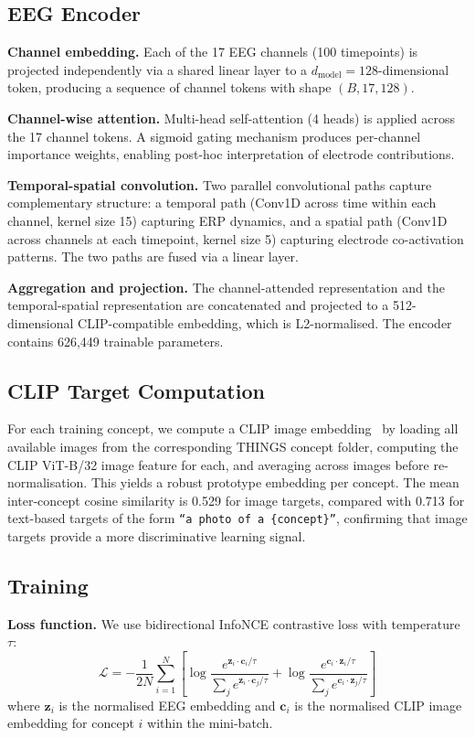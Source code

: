 \documentclass[conference]{IEEEtran}
\begin{document}
\subsection{EEG Encoder}

\textbf{Channel embedding.}
Each of the 17 EEG channels (100 timepoints)
is projected independently via a shared
linear layer to a $d_\text{model}{=}128$-dimensional
token, producing a sequence of channel
tokens with shape $(B, 17, 128)$.

\textbf{Channel-wise attention.}
Multi-head self-attention (4 heads) is
applied across the 17 channel tokens. A
sigmoid gating mechanism produces
per-channel importance weights, enabling
post-hoc interpretation of electrode
contributions.

\textbf{Temporal-spatial convolution.}
Two parallel convolutional paths capture
complementary structure: a temporal path
(Conv1D across time within each channel,
kernel size 15) capturing ERP dynamics,
and a spatial path (Conv1D across channels
at each timepoint, kernel size 5) capturing
electrode co-activation patterns. The two
paths are fused via a linear layer.

\textbf{Aggregation and projection.}
The channel-attended representation and
the temporal-spatial representation are
concatenated and projected to a
512-dimensional CLIP-compatible embedding,
which is L2-normalised. The encoder contains
626{,}449 trainable parameters.

\subsection{CLIP Target Computation}

For each training concept, we compute a CLIP
image embedding~\cite{radford2021} by loading
all available images from the corresponding
THINGS concept folder, computing the CLIP
ViT-B/32 image feature for each, and
averaging across images before
re-normalisation. This yields a robust
prototype embedding per concept. The mean
inter-concept cosine similarity is 0.529
for image targets, compared with 0.713 for
text-based targets of the form
\texttt{``a photo of a \{concept\}''}, confirming
that image targets provide a more
discriminative learning signal.

\subsection{Training}

\textbf{Loss function.}
We use bidirectional InfoNCE contrastive loss
with temperature $\tau$:
\begin{equation}
\mathcal{L} = -\frac{1}{2N}\sum_{i=1}^{N}
\left[
  \log\frac{e^{\mathbf{z}_i \cdot
    \mathbf{c}_i/\tau}}
    {\sum_j e^{\mathbf{z}_i \cdot
    \mathbf{c}_j/\tau}}
  + \log\frac{e^{\mathbf{c}_i \cdot
    \mathbf{z}_i/\tau}}
    {\sum_j e^{\mathbf{c}_i \cdot
    \mathbf{z}_j/\tau}}
\right]
\end{equation}
where $\mathbf{z}_i$ is the normalised EEG
embedding and $\mathbf{c}_i$ is the
normalised CLIP image embedding for concept
$i$ within the mini-batch.
\end{document}
